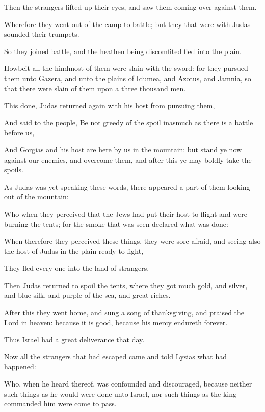 {\par }{\PP {}Then the strangers lifted up their eyes, and saw them coming over against them.
\par }{\PP {}Wherefore they went out of the camp to battle; but they that were with Judas sounded their trumpets.
\par }{\PP {}So they joined battle, and the heathen being discomfited fled into the plain.
\par }{\PP {}Howbeit all the hindmost of them were slain with the sword: for they pursued them unto Gazera, and unto the plains of Idumea, and Azotus, and Jamnia, so that there were slain of them upon a three thousand men.
\par }{\PP {}This done, Judas returned again with his host from pursuing them,
\par }{\PP {}And said to the people, Be not greedy of the spoil inasmuch as there is a battle before us,
\par }{\PP {}And Gorgias and his host are here by us in the mountain: but stand ye now against our enemies, and overcome them, and after this ye may boldly take the spoils.
\par }{\PP {}As Judas was yet speaking these words, there appeared a part of them looking out of the mountain:
\par }{\PP {}Who when they perceived that the Jews had put their host to flight and were burning the tents; for the smoke that was seen declared what was done:
\par }{\PP {}When therefore they perceived these things, they were sore afraid, and seeing also the host of Judas in the plain ready to fight,
\par }{\PP {}They fled every one into the land of strangers.
\par }{\PP {}Then Judas returned to spoil the tents, where they got much gold, and silver, and blue silk, and purple of the sea, and great riches.
\par }{\PP {}After this they went home, and sung a song of thanksgiving, and praised the Lord in heaven: because it is good, because his mercy endureth forever.
\par }{\PP {}Thus Israel had a great deliverance that day.
\par }{\PP {}Now all the strangers that had escaped came and told Lysias what had happened:
\par }{\PP {}Who, when he heard thereof, was confounded and discouraged, because neither such things as he would were done unto Israel, nor such things as the king commanded him were come to pass.
}
